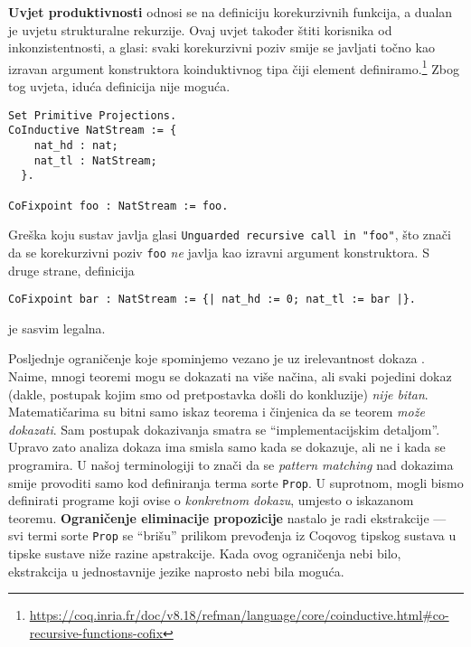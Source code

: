 \textbf{Uvjet produktivnosti} odnosi se na definiciju korekurzivnih funkcija, a dualan je uvjetu strukturalne rekurzije.
Ovaj uvjet također štiti korisnika od inkonzistentnosti, a glasi: svaki korekurzivni poziv smije se javljati točno kao izravan argument konstruktora koinduktivnog tipa čiji element definiramo.\footnote{\url{https://coq.inria.fr/doc/v8.18/refman/language/core/coinductive.html\#co-recursive-functions-cofix}}
Zbog tog uvjeta, iduća definicija nije moguća.
\begin{verbatim}
Set Primitive Projections.
CoInductive NatStream := {
    nat_hd : nat;
    nat_tl : NatStream;
  }.

CoFixpoint foo : NatStream := foo.
\end{verbatim}
Greška koju sustav javlja glasi \texttt{Unguarded recursive call in "foo"},
što znači da se korekurzivni poziv \texttt{foo} \textit{ne} javlja kao izravni argument konstruktora.
S druge strane, definicija
\begin{verbatim}
CoFixpoint bar : NatStream := {| nat_hd := 0; nat_tl := bar |}.
\end{verbatim}
\noindent je sasvim legalna.



Posljednje ograničenje koje spominjemo vezano je uz irelevantnost dokaza .
Naime, mnogi teoremi mogu se dokazati na više načina, ali svaki pojedini dokaz (dakle, postupak kojim smo od pretpostavka došli do konkluzije) \textit{nije bitan}.
Matematičarima su bitni samo iskaz teorema i činjenica da se teorem \textit{može dokazati}.
Sam postupak dokazivanja smatra se ``implementacijskim detaljom''.
Upravo zato analiza dokaza ima smisla samo kada se dokazuje, ali ne i kada se programira.
U našoj terminologiji to znači da se \textit{pattern matching} nad dokazima smije provoditi samo kod definiranja terma sorte \texttt{Prop}.
U suprotnom, mogli bismo definirati programe koji ovise o \textit{konkretnom dokazu}, umjesto o iskazanom teoremu.
\textbf{Ograničenje eliminacije propozicije} nastalo je radi ekstrakcije ---
svi termi sorte \texttt{Prop} se ``brišu'' prilikom prevođenja iz Coqovog tipskog sustava u tipske sustave niže razine apstrakcije.
Kada ovog ograničenja nebi bilo, ekstrakcija u jednostavnije jezike naprosto nebi bila moguća.


